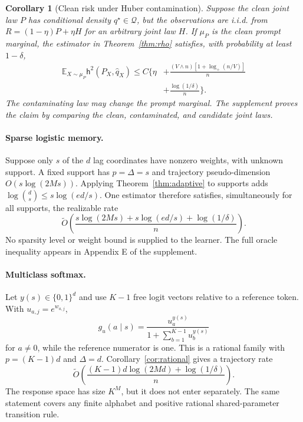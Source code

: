 \documentclass[twoside]{article}
\newtheorem{corollary}[theorem]{Corollary}
\newcommand{\E}{\mathbb E}
\newcommand{\Q}{\mathcal Q}
\newcommand{\h}{\mathsf h}
\begin{document}
\begin{corollary}[Clean risk under Huber contamination]
\label{cor:huber}
Suppose the clean joint law $P$ has conditional density $q^\star\in\Q$, but the observations are i.i.d. from $R=(1-\eta)P+\eta H$ for an arbitrary joint law $H$. If $\mu_P$ is the clean prompt marginal, the estimator in Theorem~\ref{thm:rho} satisfies, with probability at least $1-\delta$,
\begin{align*}
 \E_{X\sim\mu_P}\h^2(P_X,\widehat q_X)
 \leq C\bigg\{\eta
 &+\frac{(V\wedge n)[1+\log_+(n/V)]}{n}\\
 &+\frac{\log(1/\delta)}{n}\bigg\}.
\end{align*}
The contaminating law may change the prompt marginal. The supplement proves the claim by comparing the clean, contaminated, and candidate joint laws.
\end{corollary}

\paragraph{Sparse logistic memory.} Suppose only $s$ of the $d$ lag coordinates have nonzero weights, with unknown support. A fixed support has $p=\Delta=s$ and trajectory pseudo-dimension $O(s\log(2Ms))$. Applying Theorem~\ref{thm:adaptive} to supports adds $\log\binom ds\leq s\log(ed/s)$. One estimator therefore satisfies, simultaneously for all supports, the realizable rate
\begin{equation}
 \widetilde O\!\left(
 \frac{s\log(2Ms)+s\log(ed/s)+\log(1/\delta)}{n}
 \right).
 \label{eq:sparse-rate}
\end{equation}
No sparsity level or weight bound is supplied to the learner. The full oracle inequality appears in Appendix E of the supplement.

\paragraph{Multiclass softmax.} Let $y(s)\in\{0,1\}^d$ and use $K-1$ free logit vectors relative to a reference token. With $u_{a,j}=e^{w_{a,j}}$,
\[
 g_u(a\mid s)=\frac{u_a^{y(s)}}{1+\sum_{b=1}^{K-1}u_b^{y(s)}}
\]
for $a\neq0$, while the reference numerator is one. This is a rational family with $p=(K-1)d$ and $\Delta=d$. Corollary~\ref{cor:rational} gives a trajectory rate
\[
 \widetilde O\!\left(\frac{(K-1)d\log(2Md)+\log(1/\delta)}{n}\right).
\]
The response space has size $K^M$, but it does not enter separately. The same statement covers any finite alphabet and positive rational shared-parameter transition rule.
\end{document}
